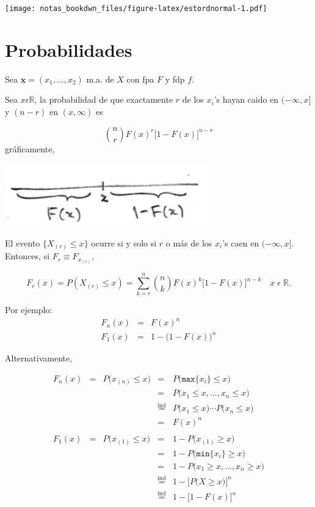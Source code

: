 \documentclass[]{book}
\begin{document}
\texttt{[image: notas\_bookdwn\_files/figure-latex/estordnormal-1.pdf]}

\hypertarget{probabilidades}{%
\section{Probabilidades}\label{probabilidades}}

Sea \(\underline{\mathbf{x}} = (x_1, \ldots, x_2)\) m.a. de \(X\) con fpa \(F\) y fdp \(f\).

Sea \(x \epsilon \mathbb{R}\), la probabilidad de que exactamente \(r\) de los \(x_i\)'s hayan caido en \((-\infty, x]\) y \((n-r)\) en \((x, \infty)\) es

\[
{n\choose r} F(x)^r \big[1 - F(x)\big]^{n-r}
\]
gráficamente,

\begin{center}\includegraphics[width=250pt]{imgs/estadord_probanr} \end{center}

El evento \(\{X_{(r)} \leq x\}\) ocurre si y solo si \(r\) o más de los \(x_i\)'s caen en \((-\infty, x]\). Entonces, si \(F_r \equiv F_{x_{(r)}}\),

\[
F_r (x) = P(X_{(r)} \leq x) = \sum_{k=r}^n {n\choose k} F(x)^k \big[1-F(x)\big]^{n-k} \quad x\; \epsilon \;\mathbb{R}.
\]

Por ejemplo:
\[
\begin{array}{ccl}
F_n(x) & = &  F(x)^n\\
F_1(x) & = &  1- \big(1-F(x)\big)^n
\end{array}
\]

Alternativamente,

\[
\begin{array}{ccccl}
F_n(x) & = &  P\big( x_{(n)} \leq x \big) & = & P\big( \texttt{max}\{x_i\} \leq x\big)  \\
 &  &   & = & P\big( x_1 \leq x, \ldots, x_n \leq x \big)  \\
 &  &   & \stackrel{\mbox{ind}}{=} & P\big( x_1 \leq x \big) \cdots P\big( x_n \leq x \big) \\
 &  &   & = & F(x)^n \\
 &  &   &  &  \\
 F_1(x) & = &  P\big( x_{(1)} \leq x \big) & = & 1- P\big( x_{(1)} \geq x\big)  \\
 &  &   & = &  1-P\big( \texttt{min}\{x_i\} \geq x\big)  \\
 &  &   & = & 1 - P\big( x_1 \geq x, \ldots, x_n \geq x \big)  \\
 &  &   & \stackrel{\mbox{ind}}{=} & 1- \Big[P\big( X \geq x \big)\Big]^n  \\
 &  &   & \stackrel{\mbox{ind}}{=} & 1- \Big[  1 - F(x)\Big]^n 
\end{array}
\]
\end{document}
